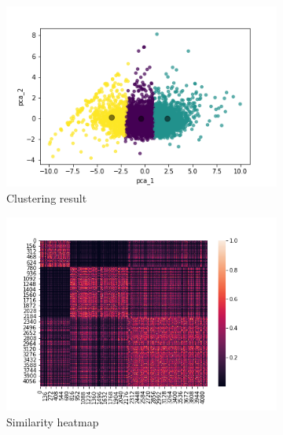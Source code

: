\begin{figure}[h!]
    \centering
    \captionsetup{justification=centering}
    \begin{subfigure}{0.32\textwidth}
        \includegraphics[width=\textwidth]{img/clustering/km_clusters.png}
        \caption{Clustering result}
        \label{fig:skmclust}
    \end{subfigure}
    \begin{subfigure}{0.32\textwidth}
        \includegraphics[width=\textwidth]{img/clustering/sim_heatmap.png}
        \caption{Similarity heatmap}
        \label{fig:sim_heatmap}
    \end{subfigure}
    \begin{subfigure}{0.32\textwidth}

\end{subfigure}
\end{figure}
